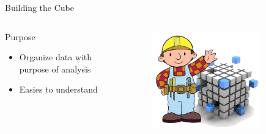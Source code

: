 
\begin{frame}{Building the Cube}
\begin{columns}
\begin{block}{Purpose}
\begin{itemize}
    \item Organize data with purpose of analysis
    \item Easies to understand
\end{itemize}
\end{block}
\begin{figure}
        \includegraphics[width=0.8\textwidth]{images/cubeBuilder.png}
    \end{figure}
\end{columns}


\end{frame}

